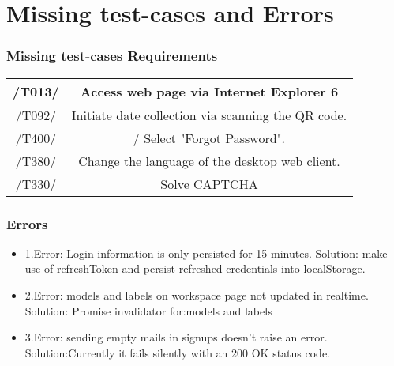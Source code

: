\section{Missing test-cases and Errors}
\subsubsection{Missing test-cases Requirements}
\begin{table}[h]
\begin{tabular}{!{\VRule}c!{\VRule}c!{\VRule}}
 \hline
/T013/ & Access web page via Internet Explorer 6  \\
 \hline 
/T092/ &  Initiate date collection via scanning the QR code.  \\
 \hline
 /T400/ &  / Select "Forgot Password".               \\
 \hline 
/T380/  &  Change the language of the desktop web client. \\
 \hline
 /T330/  &  Solve CAPTCHA  \\
 \hline
\end{tabular}
\end{table}

\subsubsection{Errors}
\begin{itemize}
  \item 1.Error: Login information is only persisted for 15 minutes.
  \newline
  Solution: make use of refreshToken and persist refreshed credentials into localStorage.
  \item 2.Error:  models and labels on workspace page not updated in realtime.
  \newline
  Solution: Promise invalidator for:models and labels
  \item 3.Error: sending empty mails in signups doesn't raise an error.
  \newline
  Solution:Currently it fails silently with an 200 OK status code.
\end{itemize}
